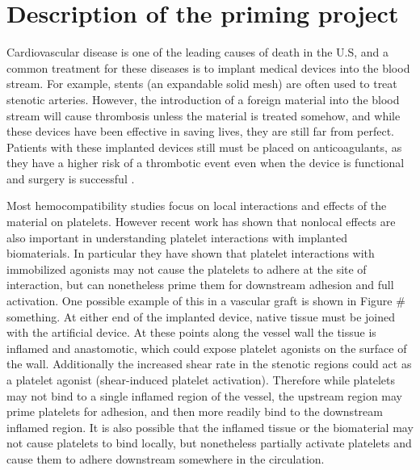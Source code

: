 


\section{Description of the priming project}
\label{sec:priming-project}

Cardiovascular disease is one of the leading causes of death in the
U.S, and a common treatment for these diseases is to implant medical
devices into the blood stream. For example, stents (an expandable
solid mesh) are often used to treat stenotic arteries. However, the
introduction of a foreign material into the blood stream will cause
thrombosis unless the material is treated somehow, and while these
devices have been effective in saving lives, they are still far from
perfect. Patients with these implanted devices still must be placed on
anticoagulants, as they have a higher risk of a thrombotic event even
when the device is functional and surgery is successful
\cite{Cannegieter1994}.
		

Most hemocompatibility studies focus on local interactions and effects
of the material on platelets. However recent work
\cite{Corum2011,Corum2012} has shown that nonlocal effects are also
important in understanding platelet interactions with implanted
biomaterials. In particular they have shown that platelet interactions
with immobilized agonists may not cause the platelets to adhere at the
site of interaction, but can nonetheless prime them for downstream
adhesion and full activation. One possible example of this in a
vascular graft is shown in Figure \# something. At either end of the
implanted device, native tissue must be joined with the artificial
device. At these points along the vessel wall the tissue is inflamed
and anastomotic, which could expose platelet agonists on the surface
of the wall. Additionally the increased shear rate in the stenotic
regions could act as a platelet agonist (shear-induced platelet
activation). Therefore while platelets may not bind to a single
inflamed region of the vessel, the upstream region may prime platelets
for adhesion, and then more readily bind to the downstream inflamed
region. It is also possible that the inflamed tissue or the
biomaterial may not cause platelets to bind locally, but nonetheless
partially activate platelets and cause them to adhere downstream
somewhere in the circulation.
		
